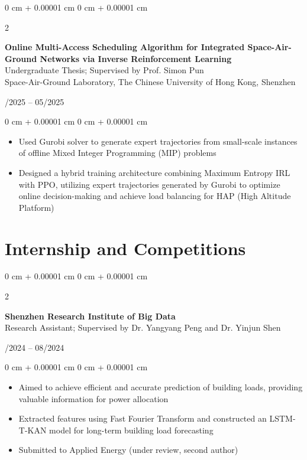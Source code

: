 \documentclass[10pt, letterpaper]{article}
\newenvironment{highlights}{
    \begin{itemize}[
        topsep=0.10 cm,
        parsep=0.10 cm,
        partopsep=0pt,
        itemsep=0pt,
        leftmargin=0 cm + 10pt
    ]
}{
    \end{itemize}
} %
\newenvironment{onecolentry}{
    \begin{adjustwidth}{
        0 cm + 0.00001 cm
    }{
        0 cm + 0.00001 cm
    }
}{
    \end{adjustwidth}
} %
\newenvironment{twocolentry}[2][]{
    \onecolentry
    \def\secondColumn{#2}
    \setcolumnwidth{\fill, 4.5 cm}
    \begin{paracol}{2}
}{
    \switchcolumn \raggedleft \secondColumn
    \end{paracol}
    \endonecolentry
} %
\begin{document}
        \vspace{0.2 cm}

        \begin{twocolentry}{
            01/2025 -- 05/2025
        }
            \textbf{Online Multi-Access Scheduling Algorithm for Integrated Space-Air-Ground Networks via Inverse Reinforcement Learning}\\
            Undergraduate Thesis; Supervised by Prof. Simon Pun\\
            Space-Air-Ground Laboratory, The Chinese University of Hong Kong, Shenzhen
        \end{twocolentry}

        \vspace{0.10 cm}
        \begin{onecolentry}
            \begin{highlights}
                \item Used Gurobi solver to generate expert trajectories from small-scale instances of offline Mixed Integer Programming (MIP) problems
                \item Designed a hybrid training architecture combining Maximum Entropy IRL with PPO, utilizing expert trajectories generated by Gurobi to optimize online decision-making and achieve load balancing for HAP (High Altitude Platform)
            \end{highlights}
        \end{onecolentry}



    
    \section{Internship and Competitions}

        \begin{twocolentry}{
            04/2024 -- 08/2024
        }
            \textbf{Shenzhen Research Institute of Big Data}\\
            Research Assistant; Supervised by Dr. Yangyang Peng and Dr. Yinjun Shen
        \end{twocolentry}

        \vspace{0.10 cm}
        \begin{onecolentry}
            \begin{highlights}
                \item Aimed to achieve efficient and accurate prediction of building loads, providing valuable information for power allocation
                \item Extracted features using Fast Fourier Transform and constructed an LSTM-T-KAN model for long-term building load forecasting
                \item Submitted to Applied Energy (under review, second author)
            \end{highlights}
        \end{onecolentry}
\end{document}

